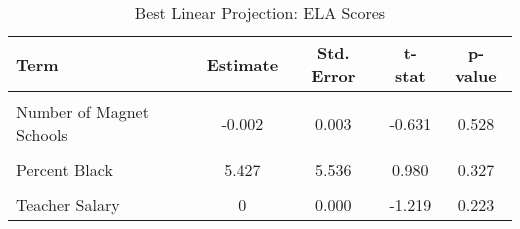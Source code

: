 \begin{table}[H]%
\centering
\caption{\label{tab:blp_ela}Best Linear Projection: ELA Scores}
\centering
\begin{tabular}[t]{lcccc}
\toprule
Term & Estimate & Std. Error & t-stat & p-value\\
\midrule
\cellcolor{gray!10}{(Intercept)} & \cellcolor{gray!10}{0.012} & \cellcolor{gray!10}{0.044} & \cellcolor{gray!10}{0.267} & \cellcolor{gray!10}{0.790}\\
Number of Magnet Schools & -0.002 & 0.003 & -0.631 & 0.528\\
\cellcolor{gray!10}{Urban} & \cellcolor{gray!10}{0.528} & \cellcolor{gray!10}{0.347} & \cellcolor{gray!10}{1.523} & \cellcolor{gray!10}{0.128}\\
Percent Black & 5.427 & 5.536 & 0.980 & 0.327\\
\cellcolor{gray!10}{Log of Enrollment} & \cellcolor{gray!10}{1.046***} & \cellcolor{gray!10}{0.394} & \cellcolor{gray!10}{2.659} & \cellcolor{gray!10}{0.008}\\
Teacher Salary & 0 & 0.000 & -1.219 & 0.223\\
\bottomrule
\end{tabular}
\end{table}
